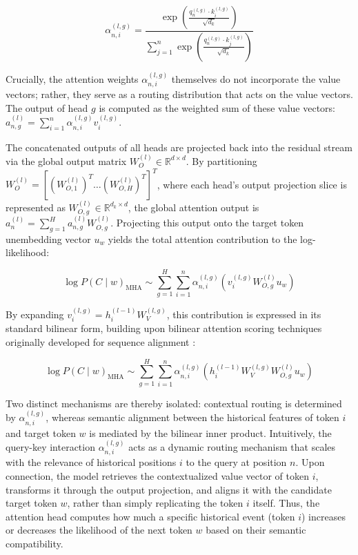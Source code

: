 \documentclass[11pt,a4paper]{article}
\begin{document}
	\begin{equation}
		\alpha_{n,i}^{(l, g)} = \frac{\exp\left(\frac{q_n^{(l, g)} \cdot k_i^{(l, g)}}{\sqrt{d_k}}\right)}{\sum_{j=1}^n \exp\left(\frac{q_n^{(l, g)} \cdot k_j^{(l, g)}}{\sqrt{d_k}}\right)}
	\end{equation}
	
	Crucially, the attention weights $\alpha_{n,i}^{(l, g)}$ themselves do not incorporate the value vectors; rather, they serve as a routing distribution that acts on the value vectors. The output of head $g$ is computed as the weighted sum of these value vectors: $a_{n,g}^{(l)} = \sum_{i=1}^n \alpha_{n,i}^{(l, g)} v_i^{(l, g)}$. 
	
	The concatenated outputs of all heads are projected back into the residual stream via the global output matrix $W_O^{(l)} \in \mathbb{R}^{d \times d}$. By partitioning $W_O^{(l)} = [ (W_{O, 1}^{(l)})^T \dots (W_{O, H}^{(l)})^T ]^T$, where each head's output projection slice is represented as $W_{O, g}^{(l)} \in \mathbb{R}^{d_k \times d}$, the global attention output is $a_n^{(l)} = \sum_{g=1}^H a_{n,g}^{(l)} W_{O, g}^{(l)}$. Projecting this output onto the target token unembedding vector $u_w$ yields the total attention contribution to the log-likelihood:
	
	\begin{equation}
		\log P(C \mid w)_{\text{MHA}} \sim \sum_{g=1}^H \sum_{i=1}^n \alpha_{n,i}^{(l, g)} \left( v_i^{(l, g)} W_{O, g}^{(l)} u_w \right)
	\end{equation}
	
	By expanding $v_i^{(l, g)} = h_i^{(l-1)} W_V^{(l, g)}$, this contribution is expressed in its standard bilinear form, building upon bilinear attention scoring techniques originally developed for sequence alignment \citep{luong2015effective}:
	
	\begin{equation}
		\log P(C \mid w)_{\text{MHA}} \sim \sum_{g=1}^H \sum_{i=1}^n \alpha_{n,i}^{(l, g)} \left( h_i^{(l-1)} W_V^{(l, g)} W_{O, g}^{(l)} u_w \right)
	\end{equation}
	
	Two distinct mechanisms are thereby isolated: contextual routing is determined by $\alpha_{n,i}^{(l, g)}$, whereas semantic alignment between the historical features of token $i$ and target token $w$ is mediated by the bilinear inner product. Intuitively, the query-key interaction $\alpha_{n,i}^{(l, g)}$ acts as a dynamic routing mechanism that scales with the relevance of historical positions $i$ to the query at position $n$. Upon connection, the model retrieves the contextualized value vector of token $i$, transforms it through the output projection, and aligns it with the candidate target token $w$, rather than simply replicating the token $i$ itself. Thus, the attention head computes how much a specific historical event (token $i$) increases or decreases the likelihood of the next token $w$ based on their semantic compatibility.
	
\end{document}
